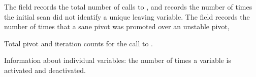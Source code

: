 \begin{codedoc}
  The  field records the total number of calls to
  , and  records the number of times
  the initial scan did not identify a unique leaving variable.
  The  field records the number of times
  that a sane pivot was promoted over an unstable pivot,

  \item{}
  Total pivot and iteration counts for the call to .

  \item{}
  Information about individual variables: the number of times a variable is
  activated and deactivated.
\end{codedoc}

